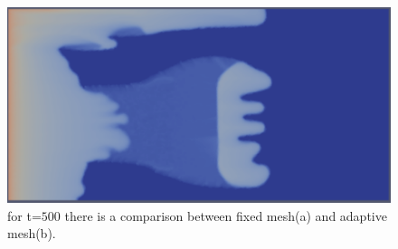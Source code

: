 \documentclass[preprint,authoryear,12pt]{elsarticle}
\begin{document}
\begin{figure}[htbp]                
\centering
\includegraphics{./Pics1/5reg_dinlet_fixed_500.pdf}
\caption{for t=$500$ there is a comparison between fixed mesh(a) and adaptive mesh(b).}
\label{fig:3testcase_b}
\end{figure}

\end{document}
